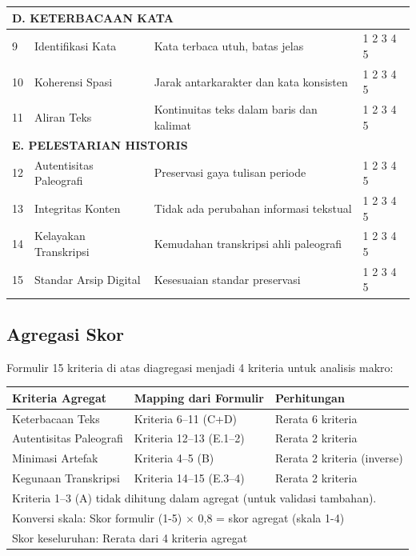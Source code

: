 \begin{longtable}{|p{0.45cm}|p{3.2cm}|p{6.8cm}|p{1.5cm}|}
\multicolumn{4}{|l|}{\textbf{D. KETERBACAAN KATA}} \\
\hline
9 & Identifikasi Kata & Kata terbaca utuh, batas jelas & 1 2 3 4 5 \\
\hline
10 & Koherensi Spasi & Jarak antarkarakter dan kata konsisten & 1 2 3 4 5 \\
\hline
11 & Aliran Teks & Kontinuitas teks dalam baris dan kalimat & 1 2 3 4 5 \\
\hline

\multicolumn{4}{|l|}{\textbf{E. PELESTARIAN HISTORIS}} \\
\hline
12 & Autentisitas Paleografi & Preservasi gaya tulisan periode & 1 2 3 4 5 \\
\hline
13 & Integritas Konten & Tidak ada perubahan informasi tekstual & 1 2 3 4 5 \\
\hline
14 & Kelayakan Transkripsi & Kemudahan transkripsi ahli paleografi & 1 2 3 4 5 \\
\hline
15 & Standar Arsip Digital & Kesesuaian standar preservasi & 1 2 3 4 5 \\
\hline

\end{longtable}

\vspace{1em}

\subsection*{Agregasi Skor}

Formulir 15 kriteria di atas diagregasi menjadi 4 kriteria untuk analisis makro:

\begin{table}[h]
\centering
\small
\begin{tabular}{|l|l|l|}
\hline
\textbf{Kriteria Agregat} & \textbf{Mapping dari Formulir} & \textbf{Perhitungan} \\
\hline
Keterbacaan Teks & Kriteria 6--11 (C+D) & Rerata 6 kriteria \\
Autentisitas Paleografi & Kriteria 12--13 (E.1--2) & Rerata 2 kriteria \\
Minimasi Artefak & Kriteria 4--5 (B) & Rerata 2 kriteria (inverse) \\
Kegunaan Transkripsi & Kriteria 14--15 (E.3--4) & Rerata 2 kriteria \\
\hline
\multicolumn{3}{l}{\footnotesize Kriteria 1--3 (A) tidak dihitung dalam agregat (untuk validasi tambahan).} \\
\multicolumn{3}{l}{\footnotesize Konversi skala: Skor formulir (1-5) $\times$ 0,8 = skor agregat (skala 1-4)} \\
\multicolumn{3}{l}{\footnotesize Skor keseluruhan: Rerata dari 4 kriteria agregat} \\
\end{tabular}
\end{table}


